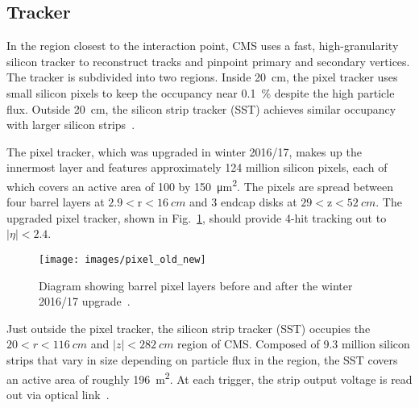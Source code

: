 \documentclass[12pt]{article}
\begin{document}
    \subsection{Tracker}
        In the region closest to the interaction point, CMS uses a fast, high-granularity silicon tracker to reconstruct tracks and pinpoint primary and secondary vertices. The tracker is subdivided into two regions. Inside \SI{20}{cm}, the pixel tracker uses small silicon pixels to keep the occupancy near \SI{0.1}{\percent} despite the high particle flux. Outside \SI{20}{\cm}, the silicon strip tracker (SST) achieves similar occupancy with larger silicon strips~\cite{cms_tdr}.  

        The pixel tracker, which was upgraded in winter 2016/17, makes up the innermost layer and features approximately \num{124} million silicon pixels, each of which covers an active area of \num{100} by \SI{150}{\micro\meter^2}. The pixels are spread between four barrel layers at $\num{2.9}<\mathrm{r}<\SI{16}{cm}$ and 3 endcap disks at $\num{29} < \mathrm{z} < \SI{52}{cm}$. The upgraded pixel tracker, shown in Fig.~\ref{pixel_old_new}, should provide 4-hit tracking out to $\lvert\eta\rvert < \num{2.4}$.

        \noindent \begin{figure}[htbp] \begin{center}
            \texttt{[image: images/pixel\_old\_new]}
            \caption{Diagram showing barrel pixel layers before and after the winter 2016/17 upgrade~\cite{pixel_old_new}.}
            \label{pixel_old_new}
        \end{center} \end{figure}
        
        Just outside the pixel tracker, the silicon strip tracker (SST) occupies the $\num{20} < r < \SI{116}{cm}$ and $\lvert z \rvert < \SI{282}{cm}$ region of CMS. Composed of \num{9.3} million silicon strips that vary in size depending on particle flux in the region, the SST covers an active area of roughly \SI{196}{m^2}. At each trigger, the strip output voltage is read out via optical link~\cite{cms_pixel_upgrade}.
\end{document}
